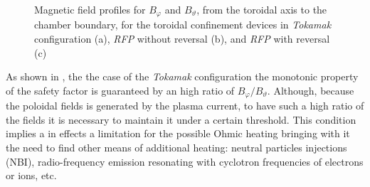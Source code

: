 \begin{figure}
    \centering
    \caption{Magnetic field profiles for $B_\varphi$ and $B_\vartheta$, from the toroidal axis to the chamber boundary, for the toroidal confinement devices in \textit{Tokamak} configuration (a), \textit{RFP} without reversal (b), and \textit{RFP} with reversal (c)    }
    \label{fig:intro_safety_factor_profiles}
\end{figure}
As shown in \Figure{\ref{fig:intro_safety_factor_profiles_a}}, the the case of the \textit{Tokamak} configuration the monotonic property of the safety factor is guaranteed by an high ratio of $B_\varphi/B_\vartheta$. Although, because the poloidal fields is generated by the plasma current, to have such a high ratio of the fields it is necessary to maintain it under a certain threshold. This condition implies a in effects a limitation for the possible Ohmic heating bringing with it the need to find other means of additional heating: neutral particles injections (NBI), radio-frequency emission resonating with cyclotron frequencies of electrons or ions, etc.

